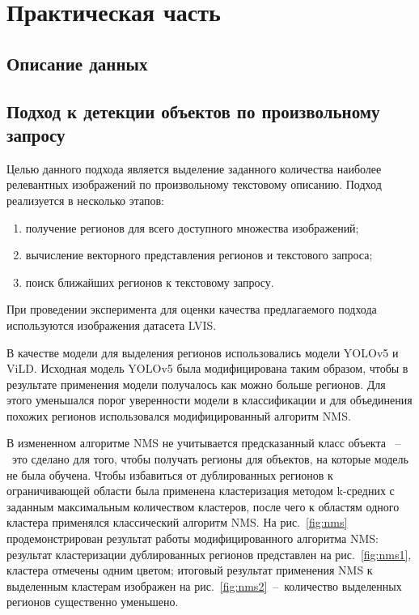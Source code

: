 \documentclass[a4paper,14pt]{article}
\begin{document}
    \newpage


    \section{Практическая часть}

    \subsection{Описание данных}

    \subsection{Подход к детекции объектов по произвольному запросу}

    Целью данного подхода является выделение заданного количества наиболее релевантных изображений по произвольному текстовому описанию.
    Подход реализуется в несколько этапов:
    \begin{enumerate}
        [1)]
        \itemsep0em
        \item получение регионов для всего доступного множества изображений;
        \item вычисление векторного представления регионов и текстового запроса;
        \item поиск ближайших регионов к текстовому запросу.
    \end{enumerate}

    При проведении эксперимента для оценки качества предлагаемого подхода используются изображения датасета LVIS.

    В качестве модели для выделения регионов использовались модели YOLOv5 и ViLD.
    Исходная модель YOLOv5 была модифицирована таким образом, чтобы в результате применения модели получалось как можно больше регионов.
    Для этого уменьшался порог уверенности модели в классификации и для объединения похожих регионов использовался модифицированный алгоритм NMS.

    В измененном алгоритме NMS не учитывается предсказанный класс объекта	~--~это сделано для того, чтобы получать регионы для объектов, на которые модель не была обучена.
    Чтобы избавиться от дублированных регионов к ограничивающей области была применена кластеризация методом k-средних с заданным максимальным количеством кластеров, после чего к областям одного кластера применялся классический алгоритм NMS.
    На рис.~\ref{fig:nms} продемонстрирован результат работы модифицированного алгоритма NMS: результат кластеризации дублированных регионов представлен на рис.~\ref{fig:nms1}, кластера отмечены одним цветом; итоговый результат применения NMS к выделенным кластерам изображен на рис.~\ref{fig:nms2}~--~количество выделенных регионов существенно уменьшено.
\end{document}

